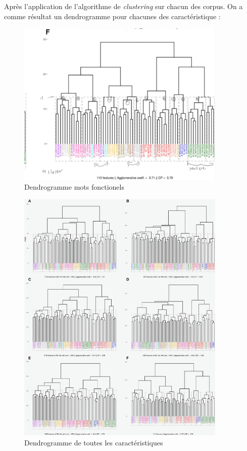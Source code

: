 \vspace{\baselineskip}
Après l’application de l’algorithme de \textit{clustering} sur chacun des
corpus. On a comme résultat un dendrogramme pour chacunes des caractéristique :

\begin{figure}[htbp]
    \centering
    \includegraphics[width=10cm]{Ressources/IMG_0552.png}
    \caption{Dendrogramme mots fonctionels}
    \label{fig:images}
  \end{figure}
  \vspace{\baselineskip}

  \begin{figure}[htbp]
    \centering
    \includegraphics[width=10cm]{Ressources/Fig. 1 JPEG-1.png}
    \caption{Dendrogramme de toutes les caractéristiques}
    \label{fig:images}
  \end{figure}
  


